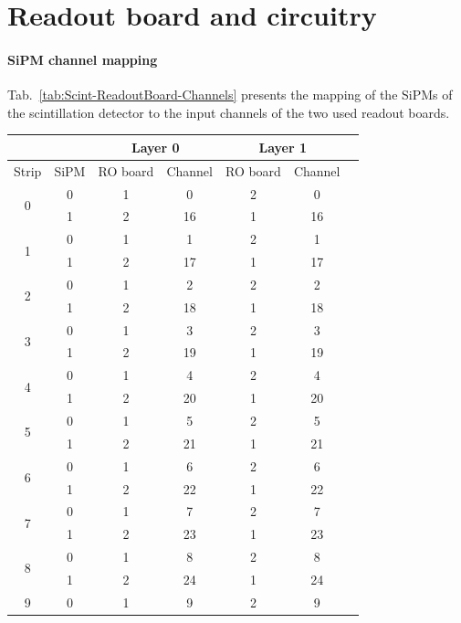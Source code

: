 
\section{Readout board and circuitry}

\FloatBarrier
\paragraph{SiPM channel mapping}
Tab.\ \ref{tab:Scint-ReadoutBoard-Channels} presents the mapping of the \acp{SiPM} of the scintillation detector to the input channels of the two used readout boards.
\begin{table}[htb]
    \centering
    \begin{tabular}{|c|c|c|c|c|c|c} 
        \hline
        \multicolumn{2}{|c|}{} & \multicolumn{2}{c|}{Layer 0} & \multicolumn{2}{c|}{Layer 1} \\ \hline
        Strip & \ac{SiPM} & RO board & Channel & RO board & Channel \\ \hline
        \multirow{2}{*}{0} & 0 & 1 & 0 & 2 & 0 \\
        & 1 & 2 & 16 & 1 & 16 \\ \hline
        \multirow{2}{*}{1} & 0 & 1 & 1 & 2 & 1 \\
        & 1 & 2 & 17 & 1 & 17 \\ \hline
        \multirow{2}{*}{2} & 0 & 1 & 2 & 2 & 2 \\
        & 1 & 2 & 18 & 1 & 18 \\ \hline
        \multirow{2}{*}{3} & 0 & 1 & 3 & 2 & 3 \\
        & 1 & 2 & 19 & 1 & 19 \\ \hline
        \multirow{2}{*}{4} & 0 & 1 & 4 & 2 & 4 \\
        & 1 & 2 & 20 & 1 & 20 \\ \hline
        \multirow{2}{*}{5} & 0 & 1 & 5 & 2 & 5 \\
        & 1 & 2 & 21 & 1 & 21 \\ \hline
        \multirow{2}{*}{6} & 0 & 1 & 6 & 2 & 6 \\
        & 1 & 2 & 22 & 1 & 22 \\ \hline
        \multirow{2}{*}{7} & 0 & 1 & 7 & 2 & 7 \\
        & 1 & 2 & 23 & 1 & 23 \\ \hline
        \multirow{2}{*}{8} & 0 & 1 & 8 & 2 & 8 \\
        & 1 & 2 & 24 & 1 & 24 \\ \hline
        \multirow{2}{*}{9} & 0 & 1 & 9 & 2 & 9 \\

\end{tabular}
\end{table}
